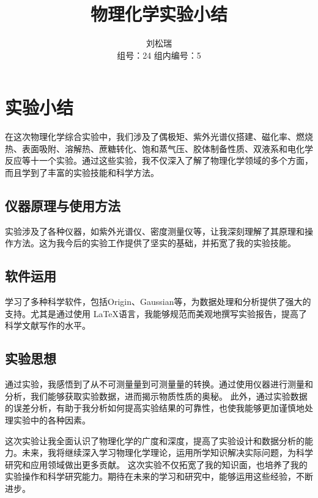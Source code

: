 \documentclass[cn,hazy,pku,12pt,normal,math=newtx,cite=super]{elegantnote}
\title{物理化学实验小结}
\author{刘松瑞 \quad 2100011819 \\ 组号：24 \quad 组内编号：5}
\institute{化学与分子工程学院}
\begin{document}
\maketitle


\section{实验小结}

在这次物理化学综合实验中，我们涉及了偶极矩、紫外光谱仪搭建、磁化率、燃烧热、表面吸附、溶解热、蔗糖转化、饱和蒸气压、胶体制备性质、双液系和电化学反应等十一个实验。通过这些实验，我不仅深入了解了物理化学领域的多个方面，而且学到了丰富的实验技能和科学方法。

\subsection{仪器原理与使用方法}

实验涉及了各种仪器，如紫外光谱仪、密度测量仪等，让我深刻理解了其原理和操作方法。这为我今后的实验工作提供了坚实的基础，并拓宽了我的实验技能。

\subsection{软件运用}

学习了多种科学软件，包括Origin、Gaussian等，为数据处理和分析提供了强大的支持。尤其是通过使用 \LaTeX 语言，我能够规范而美观地撰写实验报告，提高了科学文献写作的水平。


\subsection{实验思想}

通过实验，我感悟到了从不可测量量到可测量量的转换。通过使用仪器进行测量和分析，我们能够获取实验数据，进而揭示物质性质的奥秘。
此外，通过实验数据的误差分析，有助于我分析如何提高实验结果的可靠性，也使我能够更加谨慎地处理实验中的各种因素。


这次实验让我全面认识了物理化学的广度和深度，提高了实验设计和数据分析的能力。未来，我将继续深入学习物理化学理论，运用所学知识解决实际问题，为科学研究和应用领域做出更多贡献。
这次实验不仅拓宽了我的知识面，也培养了我的实验操作和科学研究能力。期待在未来的学习和研究中，能够运用这些经验，不断进步。
\end{document}
